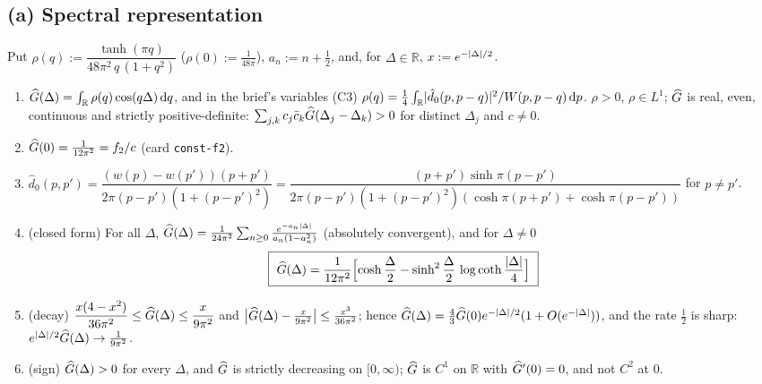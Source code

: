 \documentclass[11pt]{article}
\theoremstyle{definition}\newtheorem{hypothesis}[theorem]{Hypothesis}
\begin{document}
\subsection{(a) Spectral representation}\label{sec:T4a}
\begin{theorem}\label{thm:T4}
Put $\rho(q):=\dfrac{\tanh(\pi q)}{48\pi^2\,q\,(1+q^2)}$ ($\rho(0):=\frac1{48\pi}$), $a_n:=n+\frac12$, and,
for $\Delta\in\mathbb R$, $x:=e^{-\lvert\Delta\rvert/2}$.
\begin{enumerate}[label=(\alph*),leftmargin=2em]
\item $\widehat G(\Delta)=\int_{\mathbb R}\rho(q)\cos(q\Delta)\,\mathrm d q$, and in the brief's variables (C3)
 $\rho(q)=\frac14\int_{\mathbb R}\lvert\hat d_0(p,p-q)\rvert^2/W(p,p-q)\,\mathrm d p$.  $\rho>0$, $\rho\in L^1$; $\widehat G$ is
 real, even, continuous and strictly positive-definite: $\sum_{j,k}c_j\bar c_k\widehat G(\Delta_j-\Delta_k)>0$ for
 distinct $\Delta_j$ and $c\ne0$.
\item $\widehat G(0)=\frac1{12\pi^2}=f_2/c$ (card \texttt{const-f2}).
\item $\hat d_0(p,p')=\dfrac{(w(p)-w(p'))(p+p')}{2\pi(p-p')(1+(p-p')^2)}
 =\dfrac{(p+p')\sinh\pi(p-p')}{2\pi(p-p')(1+(p-p')^2)(\cosh\pi(p+p')+\cosh\pi(p-p'))}$ for $p\ne p'$.
\item[(cf)] (closed form) For all $\Delta$, $\widehat G(\Delta)=\frac1{24\pi^2}\sum_{n\ge0}\frac{e^{-a_n\lvert\Delta\rvert}}
 {a_n(1-a_n^2)}$ (absolutely convergent), and for $\Delta\ne0$
 \[\boxed{\ \Gh(\Delta)=\frac1{12\pi^2}\Bigl[\cosh\frac\Delta2-\sinh^2\frac\Delta2\,
 \log\coth\frac{\abs\Delta}4\Bigr]\ }\]
\item (decay) $\dfrac{x(4-x^2)}{36\pi^2}\le\widehat G(\Delta)\le\dfrac{x}{9\pi^2}$ and
 $\bigl|\widehat G(\Delta)-\frac{x}{9\pi^2}\bigr|\le\frac{x^3}{36\pi^2}$; hence
 $\widehat G(\Delta)=\frac43\widehat G(0)e^{-\lvert\Delta\rvert/2}(1+O(e^{-\lvert\Delta\rvert}))$, and the rate $\frac12$ is sharp:
 $e^{\lvert\Delta\rvert/2}\widehat G(\Delta)\to\frac1{9\pi^2}$.
\item (sign) $\widehat G(\Delta)>0$ for every $\Delta$, and $\widehat G$ is strictly decreasing on $[0,\infty)$; $\widehat G$ is
 $C^1$ on $\mathbb R$ with $\widehat G'(0)=0$, and not $C^2$ at $0$.
\end{enumerate}
\end{theorem}
\end{document}
